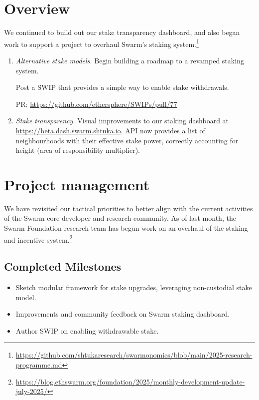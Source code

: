 \maketitle
\section*{Overview}

We continued to build out our stake transparency dashboard, and also began work to support a project to overhaul Swarm's staking system.\footnote{\url{https://github.com/shtukaresearch/swarmonomics/blob/main/2025-research-programme.md}}

\begin{enumerate}
  \item \emph{Alternative stake models.} Begin building a roadmap to a revamped staking system.

  Post a SWIP that provides a simple way to enable stake withdrawals.
  
  PR: \url{https://github.com/ethersphere/SWIPs/pull/77}
  
  \item \emph{Stake transparency.} Visual improvements to our staking dashboard at \url{https://beta.dash.swarm.shtuka.io}.
  API now provides a list of neighbourhoods with their effective stake power, correctly accounting for height (area of responsibility multiplier).

\end{enumerate}


\section*{Project management}

We have revisited our tactical priorities to better align with the current activities of the Swarm core developer and research community.
%
As of last month, the Swarm Foundation research team has begun work on an overhaul of the staking and incentive system.\footnote{\url{https://blog.ethswarm.org/foundation/2025/monthly-development-update-july-2025/}}

\subsection*{Completed Milestones}

\begin{itemize}
  \item 
    Sketch modular framework for stake upgrades, leveraging non-custodial stake model.
  \item
    Improvements and community feedback on Swarm staking dashboard.
  \item
    Author SWIP on enabling withdrawable stake.

\end{itemize}

